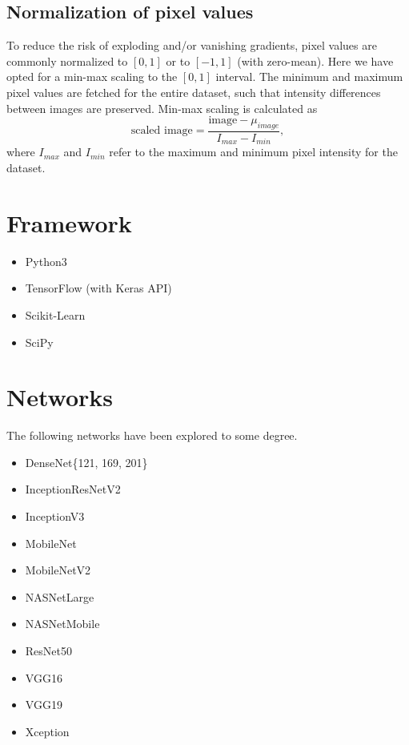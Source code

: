 \documentclass[12pt, notitlepage]{article}
\newcommand{\f}[2]{\frac{#1}{#2}}
\begin{document}
\subsection{Normalization of pixel values}
To reduce the risk of exploding and/or vanishing gradients, pixel values are commonly
normalized to $[0, 1]$ or to $[-1, 1]$ (with zero-mean). Here we have opted for a min-max scaling to the $[0, 1]$ interval.
The minimum and maximum pixel values are fetched for the entire dataset, such that intensity differences
between images are preserved. Min-max scaling is calculated as
\begin{equation}
    \text{scaled image} = \f{\text{image} - \mu_{image}}{I_{max} - I_{min}},
\end{equation}
where $I_{max}$ and $I_{min}$ refer to the maximum and minimum pixel intensity for the dataset.


\section{Framework}
\begin{itemize}
    \item Python3
    \item TensorFlow (with Keras API)
    \item Scikit-Learn
    \item SciPy
\end{itemize}
\section{Networks}
The following networks have been explored to some degree.
\begin{itemize}
    \item DenseNet\{121, 169, 201\}
    \item InceptionResNetV2
    \item InceptionV3
    \item MobileNet
    \item MobileNetV2
    \item NASNetLarge
    \item NASNetMobile
    \item ResNet50
    \item VGG16
    \item VGG19
    \item Xception
\end{itemize}
\end{document}
